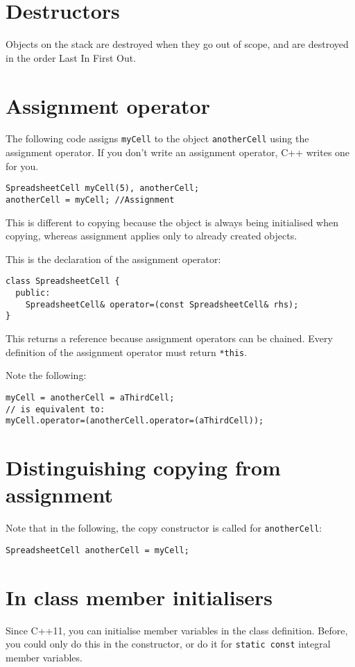 \documentclass[a4paper,12pt,oneside]{book}
\begin{document}
\section{Destructors}
Objects on the stack are destroyed when they go out of scope, and are destroyed in the order Last In First Out.

\section{Assignment operator}
The following code assigns \lstinline|myCell| to the object \lstinline|anotherCell| using the assignment operator. If you don't write an assignment operator, C++ writes one for you.

\begin{lstlisting}
SpreadsheetCell myCell(5), anotherCell;
anotherCell = myCell; //Assignment
\end{lstlisting}

This is different to copying because the object is always being initialised when copying, whereas assignment applies only to already created objects.

This is the declaration of the assignment operator:

\begin{lstlisting}
class SpreadsheetCell {
  public:
    SpreadsheetCell& operator=(const SpreadsheetCell& rhs);
}
\end{lstlisting}

This returns a reference because assignment operators can be chained. Every definition of the assignment operator must return \lstinline|*this|.

Note the following:
\begin{lstlisting}
myCell = anotherCell = aThirdCell;
// is equivalent to:
myCell.operator=(anotherCell.operator=(aThirdCell));
\end{lstlisting}

\section{Distinguishing copying from assignment}
Note that in the following, the copy constructor is called for \lstinline|anotherCell|:
\begin{lstlisting}
SpreadsheetCell anotherCell = myCell;
\end{lstlisting}
\section{In class member initialisers}
Since C++11, you can initialise member variables in the class definition. Before, you could only do this in the constructor, or do it for \lstinline|static const| integral member variables.


\sloppy
\begin{thebibliography}{99}
    
\end{thebibliography}
\end{document}
